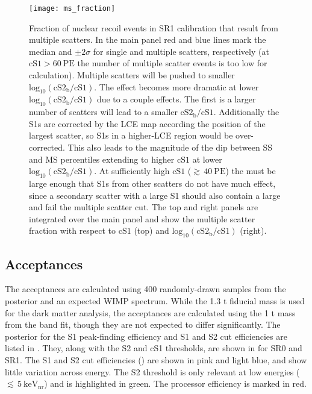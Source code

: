 \begin{figure}
\centering
\texttt{[image: ms\_fraction]}
\caption[Fraction of nuclear recoil events in SR1 \ambe calibration that result from multiple scatters in
cS1-$\mathrm{log}_{10}(\mathrm{cS2_b / cS1})$.]{Fraction of nuclear recoil events in SR1 \ambe calibration that result from multiple
scatters.  In the main panel red and
blue lines mark the median and $\pm 2\sigma$ for single and multiple scatters, respectively (at $\mathrm{cS1} > 60\ \mathrm{PE}$ the
number of multiple scatter events is too low for calculation).  Multiple scatters will be pushed to smaller
$\mathrm{log}_{10}(\mathrm{cS2_b / cS1})$.  The effect becomes more dramatic at lower
$\mathrm{log}_{10}(\mathrm{cS2_b / cS1})$ due to a couple effects.  The first is a larger number of scatters will lead to a
smaller $\mathrm{cS2_b / cS1}$.  Additionally the S1s are corrected by the LCE map
according the position of the largest scatter, so S1s in a higher-LCE region
would be over-corrected.  This also leads to the magnitude of the dip between SS and MS percentiles extending to higher $\mathrm{cS1}$
at lower $\mathrm{log}_{10}(\mathrm{cS2_b / cS1})$.  At sufficiently high $\mathrm{cS1}$ (${\gtrsim}\, 40\ \mathrm{PE}$) the
\cstwob must be large enough that S1s from other scatters do not have much effect, since a secondary scatter with a large S1 should also
contain a large \stwob and fail the multiple scatter cut.  The top and right panels are integrated over the main panel and show the
multiple scatter fraction with respect to $\mathrm{cS1}$ (top) and $\mathrm{log}_{10}(\mathrm{cS2_b / cS1})$ (right).}
\label{fig:er_nr_calibrations_results_ms_fraction}
\end{figure}



\subsection{Acceptances}
\label{subsec:dark_matter_results_selection}
The acceptances are calculated using 400 randomly-drawn samples from the posterior
and an expected WIMP spectrum.  While the 1.3 t fiducial mass is used for the dark matter analysis, the
acceptances are calculated using the 1 t mass from the band fit, though they are not expected to differ significantly.  The posterior
for the S1 peak-finding efficiency and S1 and S2 cut efficiencies are listed in
.  They, along with the S2 and cS1 thresholds, are
shown in  for SR0 and SR1.  The S1 and S2 cut
efficiencies () are shown in pink and light blue, and show little variation
across energy.  The S2 threshold
is only relevant at low energies (${\lesssim}\, 5\ \mathrm{keV_{nr}}$) and is highlighted in green.  The processor efficiency is marked in
red.

